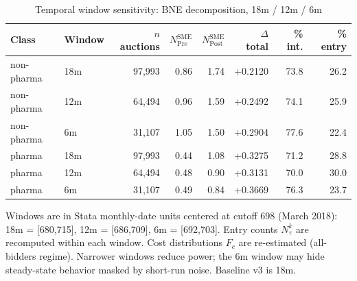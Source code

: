 \begin{table}[htbp]
\centering
\begin{threeparttable}
\caption{Temporal window sensitivity: BNE decomposition, 18m / 12m / 6m}
\label{tab:v3_window_sensitivity}
\small
\begin{tabular}{llrrrrrr}
\toprule
Class & Window & $n$ auctions & $N^{\text{SME}}_{\text{Pre}}$ & $N^{\text{SME}}_{\text{Post}}$ & $\Delta$ total & \% int. & \% entry \\
\midrule
non-pharma & 18m & 97,993 & 0.86 & 1.74 & +0.2120 & 73.8 & 26.2 \\
non-pharma & 12m & 64,494 & 0.96 & 1.59 & +0.2492 & 74.1 & 25.9 \\
non-pharma & 6m & 31,107 & 1.05 & 1.50 & +0.2904 & 77.6 & 22.4 \\
pharma & 18m & 97,993 & 0.44 & 1.08 & +0.3275 & 71.2 & 28.8 \\
pharma & 12m & 64,494 & 0.48 & 0.90 & +0.3131 & 70.0 & 30.0 \\
pharma & 6m & 31,107 & 0.49 & 0.84 & +0.3669 & 76.3 & 23.7 \\
\bottomrule
\end{tabular}
\begin{tablenotes}\footnotesize
\item Windows are in Stata monthly-date units centered at cutoff
698 (March 2018): 18m = [680,715], 12m = [686,709], 6m = [692,703].
Entry counts $N^k_\tau$ are recomputed within each window. Cost
distributions $F_c$ are re-estimated (all-bidders regime). Narrower
windows reduce power; the 6m window may hide steady-state behavior
masked by short-run noise. Baseline v3 is 18m.
\end{tablenotes}
\end{threeparttable}
\end{table}
